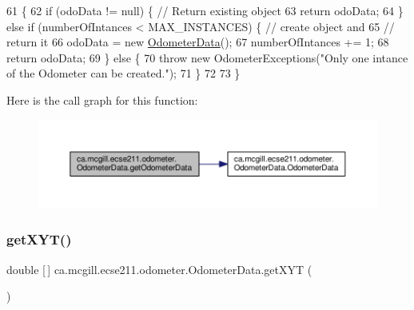 \begin{DoxyCode}
61                                                                                       \{
62     \textcolor{keywordflow}{if} (odoData != null) \{ \textcolor{comment}{// Return existing object}
63       \textcolor{keywordflow}{return} odoData;
64     \} \textcolor{keywordflow}{else} \textcolor{keywordflow}{if} (numberOfIntances < MAX\_INSTANCES) \{ \textcolor{comment}{// create object and}
65                                                    \textcolor{comment}{// return it}
66       odoData = \textcolor{keyword}{new} \hyperlink{classca_1_1mcgill_1_1ecse211_1_1odometer_1_1_odometer_data_a91412854b75c41bf3af7c8892ec0fe87}{OdometerData}();
67       numberOfIntances += 1;
68       \textcolor{keywordflow}{return} odoData;
69     \} \textcolor{keywordflow}{else} \{
70       \textcolor{keywordflow}{throw} \textcolor{keyword}{new} OdometerExceptions(\textcolor{stringliteral}{"Only one intance of the Odometer can be created."});
71     \}
72 
73   \}
\end{DoxyCode}
Here is the call graph for this function\+:\nopagebreak
\begin{figure}[H]
\begin{center}
\leavevmode
\includegraphics[width=350pt]{classca_1_1mcgill_1_1ecse211_1_1odometer_1_1_odometer_data_afff2d760dd1f861b580f3eacef37f1cc_cgraph}
\end{center}
\end{figure}
\mbox{\label{classca_1_1mcgill_1_1ecse211_1_1odometer_1_1_odometer_data_a8f40f0264c68f0cbed4fff1723ae7863}} 
\subsubsection{\texorpdfstring{get\+X\+Y\+T()}{getXYT()}}
{\footnotesize\ttfamily double \mbox{[}$\,$\mbox{]} ca.\+mcgill.\+ecse211.\+odometer.\+Odometer\+Data.\+get\+X\+YT (\begin{DoxyParamCaption}{ }\end{DoxyParamCaption})}

